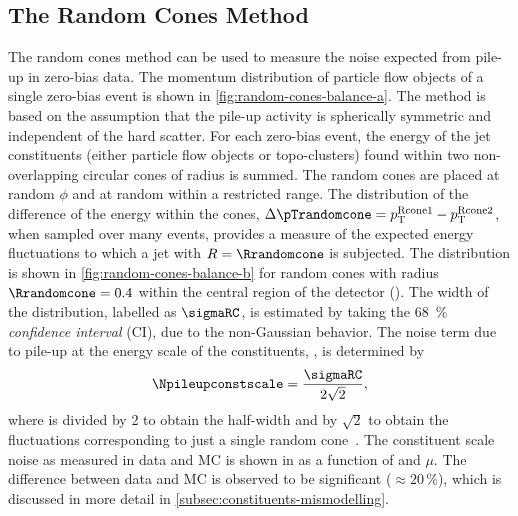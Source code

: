 

\subsection{The Random Cones Method}
\label{subsec:random-cones-method}

The random cones method can be used to measure the noise expected from pile-up in zero-bias data. The momentum distribution of particle flow objects of a single zero-bias event is shown in \cref{fig:random-cones-balance-a}.
The method is based on the assumption that the pile-up activity is spherically symmetric and independent of the hard scatter.
For each zero-bias event, the energy of the jet constituents (either particle flow objects or topo-clusters) found within two non-overlapping circular cones of radius \Rrandomcone is summed.
The random cones are placed at random $\phi$ and at random \abseta within a restricted range.
The distribution of the difference of the energy within the cones, $\Delta \pTrandomcone = p_{\text{T}}^{\text{Rcone1}} - p_{\text{T}}^\text{Rcone2}$, when sampled over many events, provides a measure of the expected energy fluctuations to which a jet with $R = \Rrandomcone$ is subjected.
The distribution is shown in \cref{fig:random-cones-balance-b} for random cones with radius $\Rrandomcone = 0.4$ within the central region of the detector (). The width of the distribution, labelled as $\sigmaRC$, is estimated by taking the \SI{68}{\percent} \emph{confidence interval} (CI), due to the non-Gaussian behavior.
The noise term due to pile-up at the energy scale of the constituents, \Npileupconstscale, is determined by
\begin{equation}
    \Npileupconstscale = \frac{\sigmaRC}{2\sqrt{2}},
\end{equation}
where \sigmaRC is divided by 2 to obtain the half-width and by $\sqrt{2}$ to obtain the fluctuations corresponding to just a single random cone~\cite{JETM-2018-05}.
The constituent scale noise as measured in data and MC is shown in  as a function of \abseta and $\mu$.
The difference between data and MC is observed to be significant ($\approx 20\,\%$), which is discussed in more detail in \cref{subsec:constituents-mismodelling}.


